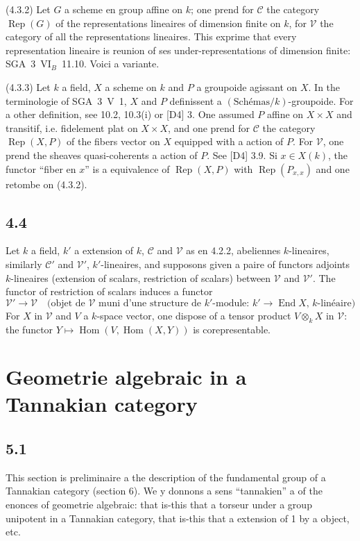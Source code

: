 \documentclass[12pt,a4paper]{article}
\theoremstyle{plain}
\theoremstyle{definition}
\theoremstyle{remark}
\DeclareMathOperator{\Hom}{Hom}
\DeclareMathOperator{\End}{End}
\DeclareMathOperator{\Rep}{Rep}
\begin{document}
(4.3.2) Let $G$ a scheme en group affine on $k$; one prend for $\mathcal{C}$ the category $\Rep(G)$ of the representations lineaires of dimension finite on $k$, for $\mathcal{V}$ the category of all the representations lineaires. This exprime that every representation lineaire is reunion of ses under-representations of dimension finite: SGA~3~VI$_{B}$~11.10. Voici a variante.

(4.3.3) Let $k$ a field, $X$ a scheme on $k$ and $P$ a groupoide agissant on $X$. In the terminologie of SGA~3~V~1, $X$ and $P$ definissent a $(\mathrm{Schémas}/k)$-groupoide. For a other definition, see 10.2, 10.3(i) or [D4] 3. One assumed $P$ affine on $X 
\times X$ and transitif, i.e. fidelement plat on $X 
\times X$, and one prend for $\mathcal{C}$ the category $\Rep(X, P)$ of the fibers vector on $X$ equipped with a action of $P$. For $\mathcal{V}$, one prend the sheaves quasi-coherents a action of $P$. See [D4] 3.9. Si $x 
\in X(k)$, the functor ``fiber en $x$'' is a equivalence of $\Rep(X,P)$ with $\Rep(P_{x,x})$ and one retombe on (4.3.2).

\subsection*{4.4}

Let $k$ a field, $k'$ a extension of $k$, $\mathcal{C}$ and $\mathcal{V}$ as en 4.2.2, abeliennes $k$-lineaires, similarly $\mathcal{C}'$ and $\mathcal{V}'$, $k'$-lineaires, and supposons given a paire of functors adjoints $k$-lineaires (extension of scalars, restriction of scalars) between $\mathcal{V}$ and $\mathcal{V}'$. The functor of restriction of scalars induces a functor
\begin{equation*}\tag{4.4.1}
\mathcal{V}' 
\longrightarrow 
\mathcal{V} 
\quad 
\text{(objet de $\mathcal{V}$ muni d'une structure de $k'$-module: $k' 
\to 
\End X$, $k$-linéaire)}
\end{equation*}
For $X$ in $\mathcal{V}$ and $V$ a $k$-space vector, one dispose of a tensor product $V 
\otimes_k X$ in $\mathcal{V}$: the functor $Y 
\mapsto 
\Hom(V, 
\Hom(X,Y))$ is corepresentable.

\section{Geometrie algebraic in a Tannakian category}
\label{sec:5}

\subsection*{5.1}
This section is preliminaire a the description of the fundamental group of a Tannakian category (section 6). We y donnons a sens ``tannakien'' a of the enonces of geometrie algebraic: that is-this that a torseur under a group unipotent in a Tannakian category, that is-this that a extension of 1 by a object, etc.
\end{document}
